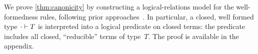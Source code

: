 We prove \cref{thm:canonicity} by constructing a logical-relations model
for the well-formedness rules, following prior approaches~\cite{coquand2018canonicity,sterling2019algebraic,kaposi2019gluing}.
In particular, a closed, well formed type $ {\cdot} \vdash {T} $ is interpreted
into a logical predicate on closed terms: the predicate includes all
closed, ``reducible'' terms of type~$T$.
The proof is available in the appendix.